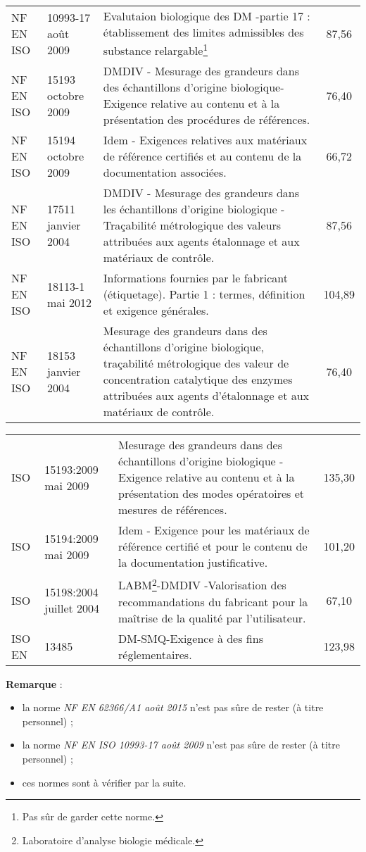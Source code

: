 \documentclass[a4paper,11pt]{article}
\newcommand{\rem}{\noindent\textbf{Remarque} : }
\begin{document}
\begin{sloppypar}
\begin{center}
{
\renewcommand{\arraystretch}{2.5} %

\begin{tabular}{p{2cm}|p{4cm}|p{5cm}|c}
 NF EN ISO & 10993-17 août 2009 & Evalutaion biologique des DM -partie 17 : établissement des limites admissibles des substance relargable\footnote{Pas sûr de garder cette norme.} & 87,56 \\
 NF EN ISO & 15193 octobre 2009 & DMDIV - Mesurage des grandeurs dans des  échantillons d'origine biologique-Exigence relative au contenu et à la présentation des procédures de références. & 76,40\\
 NF EN ISO & 15194 octobre 2009 & Idem - Exigences relatives aux matériaux de référence certifiés et au contenu de la documentation associées. & 66,72 \\
 NF EN ISO & 17511 janvier 2004 & DMDIV - Mesurage des grandeurs dans les échantillons d'origine biologique - Traçabilité métrologique des valeurs attribuées aux agents étalonnage et aux matériaux de contrôle. & 87,56 \\
 NF EN ISO & 18113-1 mai 2012 & Informations fournies par le fabricant (étiquetage). Partie 1 : termes, définition et exigence générales. & 104,89 \\
 NF EN ISO & 18153 janvier 2004 & Mesurage des grandeurs dans des échantillons d'origine biologique, traçabilité métrologique des valeur de concentration catalytique des enzymes attribuées aux agents d'étalonnage et aux matériaux de contrôle. & 76,40 
\end{tabular}
}
\end{center}

\begin{center}
{
\renewcommand{\arraystretch}{2.5} %

\begin{tabular}{p{2cm}|p{4.2cm}|p{5cm}|c}
 ISO & 15193:2009 mai 2009 & Mesurage des grandeurs dans des échantillons d'origine biologique - Exigence relative au contenu et à la présentation des modes opératoires et mesures de références. & 135,30 \\
 ISO & 15194:2009 mai 2009 & Idem - Exigence pour les matériaux de référence certifié et pour le contenu de la documentation justificative. & 101,20 \\
 ISO & 15198:2004 juillet 2004 & LABM\footnote{Laboratoire d'analyse biologie médicale.}-DMDIV -Valorisation des recommandations du fabricant pour la maîtrise de la qualité par l'utilisateur. & 67,10 \\
 ISO EN & 13485 & DM-SMQ-Exigence à des fins réglementaires. & 123,98
\end{tabular}
}
\end{center}

\rem 
\begin{itemize}
  \item la norme \emph{NF EN 62366/A1 août 2015} n'est pas sûre de rester (à titre personnel) ;
  \item la norme \emph{NF EN ISO 10993-17 août 2009} n'est pas sûre de rester (à titre personnel) ;
  \item ces normes sont à vérifier par la suite.
\end{itemize}

\end{sloppypar}
\end{document}
